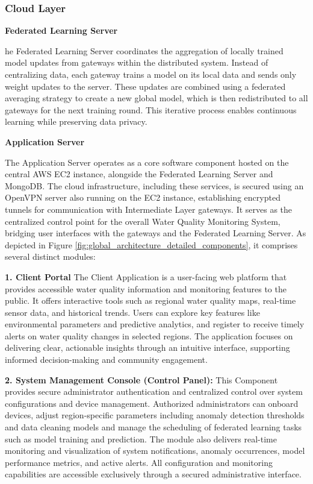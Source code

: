 \subsubsection{Cloud Layer}
\label{sssec:cloud_layer_detail} %

\textbf{Federated Learning Server}

he Federated Learning Server coordinates the aggregation of locally trained model updates from gateways within the distributed system. Instead of centralizing data, each gateway trains a model on its local data and sends only weight updates to the server. These updates are combined using a federated averaging strategy to create a new global model, which is then redistributed to all gateways for the next training round. This iterative process enables continuous learning while preserving data privacy.

\textbf{Application Server}

The Application Server operates as a core software component hosted on the central AWS EC2 instance, alongside the Federated Learning Server and MongoDB. The cloud infrastructure, including these services, is secured using an OpenVPN server also running on the EC2 instance, establishing encrypted tunnels for communication with Intermediate Layer gateways.
It serves as the centralized control point for the overall Water Quality Monitoring System, bridging user interfaces with the gateways and the Federated Learning Server. As depicted in Figure \ref{fig:global_architecture_detailed_components}, it comprises several distinct modules:

\textbf{1. Client Portal }
The Client Application is a user-facing web platform that provides accessible water quality information and monitoring features to the public. It offers interactive tools such as regional water quality maps, real-time sensor data, and historical trends. Users can explore key features like environmental parameters and predictive analytics, and register to receive timely alerts on water quality changes in selected regions. The application focuses on delivering clear, actionable insights through an intuitive interface, supporting informed decision-making and community engagement.

\textbf{2. System Management Console (Control Panel):}
This Component provides secure administrator authentication and centralized control over system configurations and device management. Authorized administrators can onboard devices, adjust region-specific parameters  including anomaly detection thresholds and data cleaning models  and manage the scheduling of federated learning tasks such as model training and prediction. The module also delivers real-time monitoring and visualization of system notifications, anomaly occurrences, model performance metrics, and active alerts. All configuration and monitoring capabilities are accessible exclusively through a secured administrative interface.

